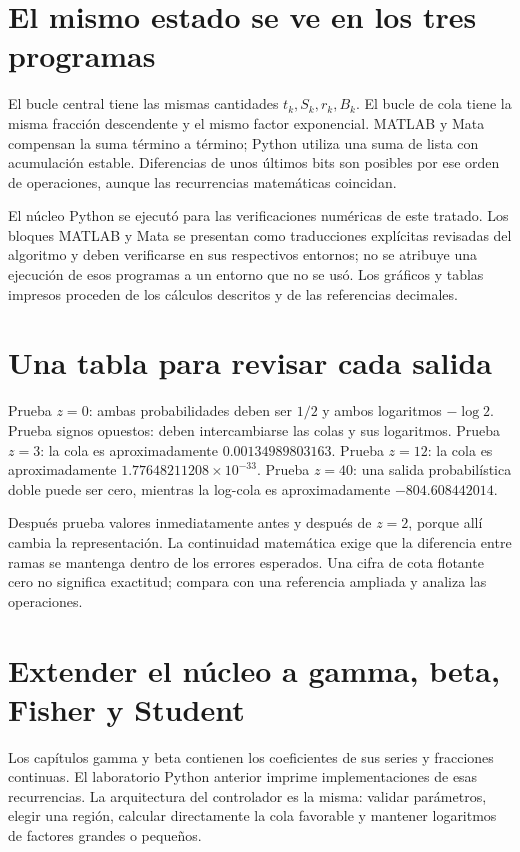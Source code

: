 \documentclass[11pt,a4paper]{article}
\theoremstyle{definition}
\begin{document}
\section{El mismo estado se ve en los tres programas}
El bucle central tiene las mismas cantidades $t_k,S_k,r_k,B_k$. El bucle de cola tiene la misma fracción descendente y el mismo factor exponencial. MATLAB y Mata compensan la suma término a término; Python utiliza una suma de lista con acumulación estable. Diferencias de unos últimos bits son posibles por ese orden de operaciones, aunque las recurrencias matemáticas coincidan.

El núcleo Python se ejecutó para las verificaciones numéricas de este tratado. Los bloques MATLAB y Mata se presentan como traducciones explícitas revisadas del algoritmo y deben verificarse en sus respectivos entornos; no se atribuye una ejecución de esos programas a un entorno que no se usó. Los gráficos y tablas impresos proceden de los cálculos descritos y de las referencias decimales.

\section{Una tabla para revisar cada salida}
Prueba $z=0$: ambas probabilidades deben ser $1/2$ y ambos logaritmos $-\log2$.
Prueba signos opuestos: deben intercambiarse las colas y sus logaritmos.
Prueba $z=3$: la cola es aproximadamente $0.00134989803163$.
Prueba $z=12$: la cola es aproximadamente $1.77648211208\times10^{-33}$.
Prueba $z=40$: una salida probabilística doble puede ser cero, mientras la log-cola es aproximadamente $-804.608442014$.

Después prueba valores inmediatamente antes y después de $z=2$, porque allí cambia la representación.
La continuidad matemática exige que la diferencia entre ramas se mantenga dentro de los errores esperados.
Una cifra de cota flotante cero no significa exactitud; compara con una referencia ampliada y analiza las operaciones.

\section{Extender el núcleo a gamma, beta, Fisher y Student}
Los capítulos gamma y beta contienen los coeficientes de sus series y fracciones continuas. El laboratorio Python anterior imprime implementaciones de esas recurrencias. La arquitectura del controlador es la misma: validar parámetros, elegir una región, calcular directamente la cola favorable y mantener logaritmos de factores grandes o pequeños.
\end{document}
